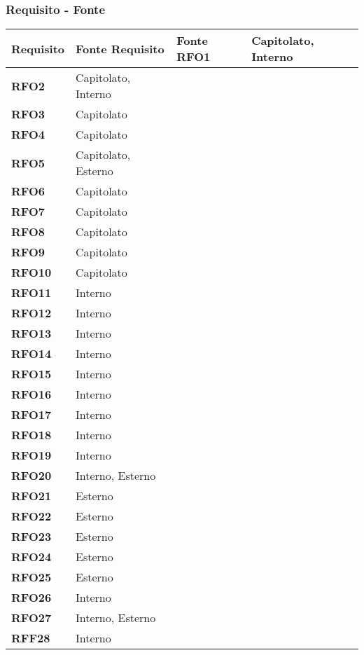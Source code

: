 \subsubsection{Requisito - Fonte}
\begin{longtable}{|>{\centering\arraybackslash}m{}|>{\centering\arraybackslash}m{}|}
	\hline
	\textbf{Requisito} & \textbf{Fonte} 
	\endfirsthead
	\hline
	\textbf{Requisito} & \textbf{Fonte} 
	\endhead
	\hline
	\textbf{RFO1} & Capitolato, Interno \\\hline
	\textbf{RFO2} & Capitolato, Interno \\\hline
	\textbf{RFO3} & Capitolato \\\hline
	\textbf{RFO4} & Capitolato \\\hline
	\textbf{RFO5} & Capitolato, Esterno \\\hline
	\textbf{RFO6} & Capitolato \\\hline
	\textbf{RFO7} & Capitolato \\\hline
	\textbf{RFO8} & Capitolato \\\hline
	\textbf{RFO9} & Capitolato \\\hline
	\textbf{RFO10} & Capitolato \\\hline
	\textbf{RFO11} & Interno \\\hline
	\textbf{RFO12} & Interno \\\hline
	\textbf{RFO13} & Interno \\\hline
	\textbf{RFO14} & Interno \\\hline
	\textbf{RFO15} & Interno \\\hline
	\textbf{RFO16} & Interno \\\hline
	\textbf{RFO17} & Interno \\\hline
	\textbf{RFO18} & Interno \\\hline
	\textbf{RFO19} & Interno \\\hline
	\textbf{RFO20} & Interno, Esterno \\\hline
	\textbf{RFO21} & Esterno \\\hline
	\textbf{RFO22} & Esterno \\\hline
	\textbf{RFO23} & Esterno \\\hline
	\textbf{RFO24} & Esterno \\\hline
	\textbf{RFO25} & Esterno \\\hline
	\textbf{RFO26} & Interno \\\hline
	\textbf{RFO27} & Interno, Esterno \\\hline
	\textbf{RFF28} & Interno \\\hline

\end{longtable}
